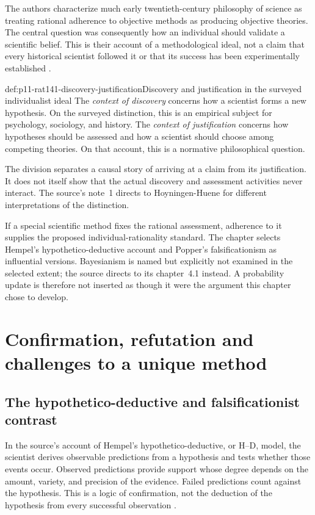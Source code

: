 The authors characterize much early twentieth-century philosophy of
science as treating rational adherence to objective methods as producing
objective theories. The central question was consequently how an
individual should validate a scientific belief. This is their account
of a methodological ideal, not a claim that every historical scientist
followed it or that its success has been experimentally established
\parencite[p.~747]{AndersenAndersen2021Scientific}.

\begin{hbdefinition}{def:p11-rat141-discovery-justification}{Discovery and justification in the surveyed individualist ideal}
The \emph{context of discovery} concerns how a scientist forms a new
hypothesis. On the surveyed distinction, this is an empirical subject
for psychology, sociology, and history. The \emph{context of
justification} concerns how hypotheses should be assessed and how a
scientist should choose among competing theories. On that account,
this is a normative philosophical question.

The division separates a causal story of arriving at a claim from its
justification. It does not itself show that the actual discovery and
assessment activities never interact. The source's note~1 directs to
Hoyningen-Huene for different interpretations of the distinction.
\end{hbdefinition}

If a special scientific method fixes the rational assessment, adherence
to it supplies the proposed individual-rationality standard. The chapter
selects Hempel's hypothetico-deductive account and Popper's
falsificationism as influential versions. Bayesianism is named but
explicitly not examined in the selected extent; the source directs to
its chapter~4.1 instead. A probability update is therefore not inserted
as though it were the argument this chapter chose to develop.

\section{Confirmation, refutation and challenges to a unique method}
\label{sec:p11-rat141-values-and-methods}

\subsection{The hypothetico-deductive and falsificationist contrast}

In the source's account of Hempel's hypothetico-deductive, or H--D,
model, the scientist derives observable predictions from a hypothesis
and tests whether those events occur. Observed predictions provide
support whose degree depends on the amount, variety, and precision of
the evidence. Failed predictions count against the hypothesis. This
is a logic of confirmation, not the deduction of the hypothesis from
every successful observation
\parencite[pp.~747--748]{AndersenAndersen2021Scientific}.

